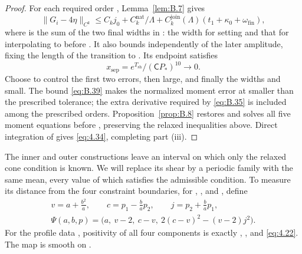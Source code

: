\begin{proof}
For each required order , Lemma~\ref{lem:B.7} gives
\[
\lVert G_i-4\eta\rVert_{C^k}
\le C_kj_0+C_k^{\mathrm{nat}}/\Lambda
   +C_k^{\mathrm{join}}(\Lambda)(t_1+\kappa_0+\omega_{\mathrm{fin}}),
\]
where  is the sum of the two final widths in
: the width for setting
 and that for interpolating
 to  before
. It also bounds
 independently of the later amplitude, fixing the
length  of the transition to
. Its endpoint satisfies
\[
x_{\mathrm{sep}}=e^{T_{\mathrm{sh}}}/(\mathsf C P_*)^{10}\longrightarrow0.
\]
Choose  to control the first two errors, then
 large, and finally the widths and
 small. The bound \eqref{eq:B.39} makes the normalized moment
error at  smaller than the prescribed tolerance; the extra
derivative required by \eqref{eq:B.35} is included among the prescribed orders.
Proposition~\ref{prop:B.8} restores  and solves all five moment
equations before , preserving the relaxed inequalities above.
Direct integration of  gives \eqref{eq:4.34}, completing part (iii).
\end{proof}

The inner and outer constructions leave an interval on which only the relaxed cone condition is
known. We will replace its shear by a periodic family with the same mean, every value of which
satisfies the admissible condition. To measure its distance from the four constraint boundaries,
for , , and
, define
\begin{equation}
\begin{gathered}
v=a+\frac{b^2}{a},\qquad c=p_1-\frac ba p_2,\qquad j=p_2+\frac ba p_1,\\
\Psi(a,b,p)=\bigl(a,\ v-2,\ c-v,\ 2(c-v)^2-(v-2)j^2\bigr).
\end{gathered}
\tag{4.35}\label{eq:4.35}
\end{equation}
For the profile data , positivity of all four components is
exactly , , and \eqref{eq:4.22}. The map
 is smooth on .

